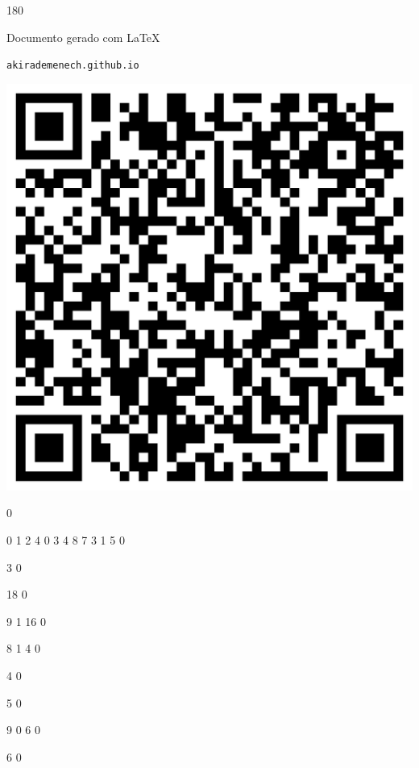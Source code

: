 \documentclass[12pt]{article}
\begin{document}
	\begin{turn}{180}	
		\begin{minipage}{\textwidth}		  
		  Documento gerado com \LaTeX			
		  
		  \texttt{akirademenech.github.io}

		  \includegraphics[height=0.3\textheight]{2e-2.pdf}

		\end{minipage}	
	\end{turn}  
		  
		\vfill  
		  
{
	0	%

	0	%
	1	%
	2	%
	4	%
	0	%
	3	%
	4	%
	8	%
	7	%
	3	%
	1	%
	5	%
	0	%

	3	%
	0	%

	18	%
	0	%

	9	%
	1	%
	16	%
	0	%

	8	%
	1	%
	4	%
	0	%

	4	%
	0	%

	5	%
	0	%

	9	%
	0	%
	6	%
	0	%

	6	%
	0	%

}	  
		    	
\end{document}
